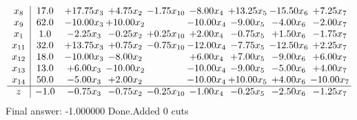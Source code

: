 \documentclass[8pt]{article}
\begin{document}
\[\begin{array}{c| c c@{\hskip 2pt} c@{\hskip 2pt} c@{\hskip 2pt} c@{\hskip 2pt} c@{\hskip 2pt} c@{\hskip 2pt} c@{\hskip 2pt} }
 x_{8}   &  17.0 & + 17.75 x_{3} & +  4.75 x_{2} & -1.75 x_{10} & -8.00 x_{4} & + 13.25 x_{5} & -15.50 x_{6} & +  7.25 x_{7}\\
 x_{9}   &  62.0 & -10.00 x_{3} & + 10.00 x_{2} &   & -10.00 x_{4} & -9.00 x_{5} & -4.00 x_{6} & -2.00 x_{7}\\
 x_{1}   &  1.0 & -2.25 x_{3} & -0.25 x_{2} & +  0.25 x_{10} & +  2.00 x_{4} & -0.75 x_{5} & +  1.50 x_{6} & -1.75 x_{7}\\
 x_{11}   &  32.0 & + 13.75 x_{3} & +  0.75 x_{2} & -0.75 x_{10} & -12.00 x_{4} & -7.75 x_{5} & -12.50 x_{6} & +  2.25 x_{7}\\
 x_{12}   &  18.0 & -10.00 x_{3} & -8.00 x_{2} &   & +  6.00 x_{4} & +  7.00 x_{5} & -9.00 x_{6} & +  6.00 x_{7}\\
 x_{13}   &  13.0 & +  6.00 x_{3} & -10.00 x_{2} &   & -10.00 x_{4} & -9.00 x_{5} & -5.00 x_{6} & +  4.00 x_{7}\\
 x_{14}   &  50.0 & -5.00 x_{3} & +  2.00 x_{2} &   & -10.00 x_{4} & + 10.00 x_{5} & +  4.00 x_{6} & -10.00 x_{7}\\
\hline
z    &  -1.0 & -0.75 x_{3} & -0.75 x_{2} & -0.25 x_{10} & -1.00 x_{4} & -0.25 x_{5} & -2.50 x_{6} & -1.25 x_{7}\\
\end{array}\]
 Final answer: -1.000000 
Done.Added 0 cuts 
\end{document}
